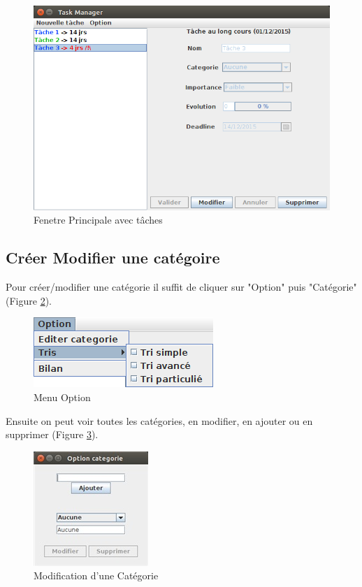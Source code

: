 \documentclass{article}
\begin{document}
\begin{figure}[!h]
	\centering
	\includegraphics[scale=0.34]{images/CaptureMainDIsplay3.png}
	\caption{Fenetre Principale avec tâches}
	\label{Fenetre principale 2}
\end{figure}

\clearpage
\subsection{Créer Modifier une catégoire}
Pour créer/modifier une catégorie il suffit de cliquer sur "Option" puis "Catégorie" (Figure \ref{barre Opiton}).

\begin{figure}[h]
	\centering
	\includegraphics[scale=0.6]{images/MenuOption.png}
	\caption{Menu Option}
	\label{barre Opiton}
\end{figure}

Ensuite on peut voir toutes les catégories, en modifier, en ajouter ou en supprimer (Figure \ref{modif Opiton}).

\begin{figure}[h]
	\centering
	\includegraphics[scale=0.8]{images/Capture_edit_categorie.jpg}
	\caption{Modification d'une Catégorie}
	\label{modif Opiton}
\end{figure}
\end{document}
